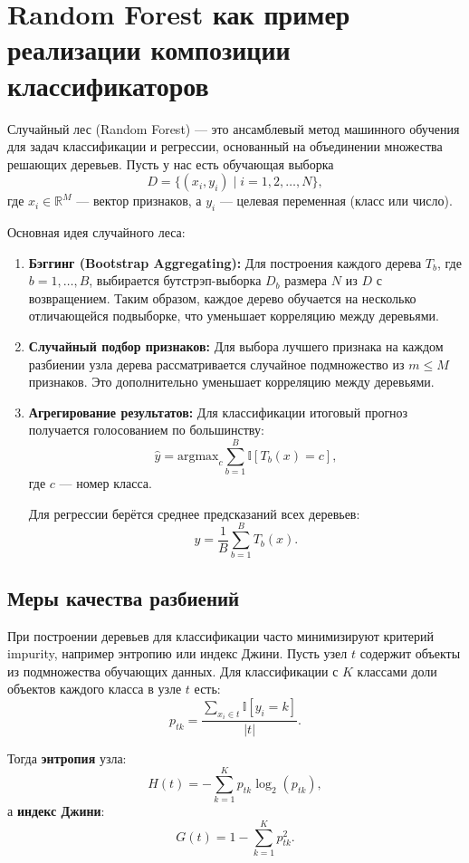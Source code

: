 \section*{Random Forest как пример реализации композиции классификаторов}

Случайный лес (Random Forest) — это ансамблевый метод машинного обучения для задач классификации и регрессии, основанный на объединении множества решающих деревьев. Пусть у нас есть обучающая выборка
\[
    D = \{ (x_i, y_i) \mid i = 1, 2, \ldots, N \},
\]
где \(x_i \in \mathbb{R}^M\) — вектор признаков, а \(y_i\) — целевая переменная (класс или число).

Основная идея случайного леса:
\begin{enumerate}
    \item \textbf{Бэггинг (Bootstrap Aggregating):} Для построения каждого дерева \(T_b\), где \(b = 1, \ldots, B\), выбирается бутстрэп-выборка \(D_b\) размера \(N\) из \(D\) с возвращением. Таким образом, каждое дерево обучается на несколько отличающейся подвыборке, что уменьшает корреляцию между деревьями.
    \item \textbf{Случайный подбор признаков:} Для выбора лучшего признака на каждом разбиении узла дерева рассматривается случайное подмножество из \(m \leq M\) признаков. Это дополнительно уменьшает корреляцию между деревьями.
    \item \textbf{Агрегирование результатов:} Для классификации итоговый прогноз получается голосованием по большинству:
          \[
              \hat{y} = \text{argmax}_c \sum_{b=1}^B \mathbb{I}[T_b(x) = c],
          \]
          где \(c\) — номер класса.

          Для регрессии берётся среднее предсказаний всех деревьев:
          \[
              \hat{y} = \frac{1}{B} \sum_{b=1}^{B} T_b(x).
          \]
\end{enumerate}

\subsection*{Меры качества разбиений}

При построении деревьев для классификации часто минимизируют критерий impurity, например энтропию или индекс Джини. Пусть узел \(t\) содержит объекты из подмножества обучающих данных. Для классификации с \(K\) классами доли объектов каждого класса в узле \(t\) есть:
\[
    p_{tk} = \frac{\sum_{x_i \in t} \mathbb{I}[y_i = k]}{|t|}.
\]

\noindent Тогда \textbf{энтропия} узла:
\[
    H(t) = -\sum_{k=1}^K p_{tk} \log_2 (p_{tk}),
\]
а \textbf{индекс Джини}:
\[
    G(t) = 1 - \sum_{k=1}^K p_{tk}^2.
\]

